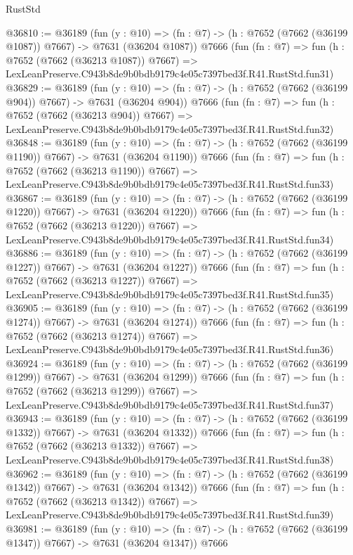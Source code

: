\begin{lexlean}{RustStd}
\begin{coremodule}
@36810 := @36189
    (fun (y : @10) => (fn : @7) -> (h : @7652 (@7662 (@36199 @1087)) @7667) -> @7631 (@36204 @1087))
    @7666
    (fun (fn : @7) =>
    fun (h : @7652 (@7662 (@36213 @1087)) @7667) =>
    LexLeanPreserve.C943b8de9b0bdb9179c4e05c7397bed3f.R41.RustStd.fun31)
@36829 := @36189
    (fun (y : @10) => (fn : @7) -> (h : @7652 (@7662 (@36199 @904)) @7667) -> @7631 (@36204 @904))
    @7666
    (fun (fn : @7) =>
    fun (h : @7652 (@7662 (@36213 @904)) @7667) =>
    LexLeanPreserve.C943b8de9b0bdb9179c4e05c7397bed3f.R41.RustStd.fun32)
@36848 := @36189
    (fun (y : @10) => (fn : @7) -> (h : @7652 (@7662 (@36199 @1190)) @7667) -> @7631 (@36204 @1190))
    @7666
    (fun (fn : @7) =>
    fun (h : @7652 (@7662 (@36213 @1190)) @7667) =>
    LexLeanPreserve.C943b8de9b0bdb9179c4e05c7397bed3f.R41.RustStd.fun33)
@36867 := @36189
    (fun (y : @10) => (fn : @7) -> (h : @7652 (@7662 (@36199 @1220)) @7667) -> @7631 (@36204 @1220))
    @7666
    (fun (fn : @7) =>
    fun (h : @7652 (@7662 (@36213 @1220)) @7667) =>
    LexLeanPreserve.C943b8de9b0bdb9179c4e05c7397bed3f.R41.RustStd.fun34)
@36886 := @36189
    (fun (y : @10) => (fn : @7) -> (h : @7652 (@7662 (@36199 @1227)) @7667) -> @7631 (@36204 @1227))
    @7666
    (fun (fn : @7) =>
    fun (h : @7652 (@7662 (@36213 @1227)) @7667) =>
    LexLeanPreserve.C943b8de9b0bdb9179c4e05c7397bed3f.R41.RustStd.fun35)
@36905 := @36189
    (fun (y : @10) => (fn : @7) -> (h : @7652 (@7662 (@36199 @1274)) @7667) -> @7631 (@36204 @1274))
    @7666
    (fun (fn : @7) =>
    fun (h : @7652 (@7662 (@36213 @1274)) @7667) =>
    LexLeanPreserve.C943b8de9b0bdb9179c4e05c7397bed3f.R41.RustStd.fun36)
@36924 := @36189
    (fun (y : @10) => (fn : @7) -> (h : @7652 (@7662 (@36199 @1299)) @7667) -> @7631 (@36204 @1299))
    @7666
    (fun (fn : @7) =>
    fun (h : @7652 (@7662 (@36213 @1299)) @7667) =>
    LexLeanPreserve.C943b8de9b0bdb9179c4e05c7397bed3f.R41.RustStd.fun37)
@36943 := @36189
    (fun (y : @10) => (fn : @7) -> (h : @7652 (@7662 (@36199 @1332)) @7667) -> @7631 (@36204 @1332))
    @7666
    (fun (fn : @7) =>
    fun (h : @7652 (@7662 (@36213 @1332)) @7667) =>
    LexLeanPreserve.C943b8de9b0bdb9179c4e05c7397bed3f.R41.RustStd.fun38)
@36962 := @36189
    (fun (y : @10) => (fn : @7) -> (h : @7652 (@7662 (@36199 @1342)) @7667) -> @7631 (@36204 @1342))
    @7666
    (fun (fn : @7) =>
    fun (h : @7652 (@7662 (@36213 @1342)) @7667) =>
    LexLeanPreserve.C943b8de9b0bdb9179c4e05c7397bed3f.R41.RustStd.fun39)
@36981 := @36189
    (fun (y : @10) => (fn : @7) -> (h : @7652 (@7662 (@36199 @1347)) @7667) -> @7631 (@36204 @1347))
    @7666

\end{coremodule}
\end{lexlean}
